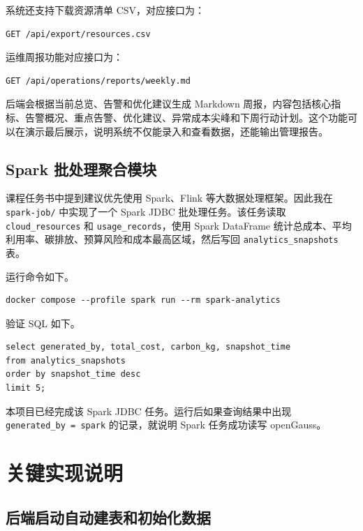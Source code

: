系统还支持下载资源清单 CSV，对应接口为：

\begin{verbatim}
GET /api/export/resources.csv
\end{verbatim}

运维周报功能对应接口为：

\begin{verbatim}
GET /api/operations/reports/weekly.md
\end{verbatim}

后端会根据当前总览、告警和优化建议生成 Markdown
周报，内容包括核心指标、告警概况、重点告警、优化建议、异常成本尖峰和下周行动计划。这个功能可以在演示最后展示，说明系统不仅能录入和查看数据，还能输出管理报告。

\subsection{Spark
批处理聚合模块}\label{spark-ux6279ux5904ux7406ux805aux5408ux6a21ux5757}

课程任务书中提到建议优先使用 Spark、Flink 等大数据处理框架。因此我在
\texttt{spark-job/} 中实现了一个 Spark JDBC 批处理任务。该任务读取
\texttt{cloud\_resources} 和 \texttt{usage\_records}，使用 Spark
DataFrame
统计总成本、平均利用率、碳排放、预算风险和成本最高区域，然后写回
\texttt{analytics\_snapshots} 表。

运行命令如下。

\begin{verbatim}
docker compose --profile spark run --rm spark-analytics
\end{verbatim}

验证 SQL 如下。

\begin{verbatim}
select generated_by, total_cost, carbon_kg, snapshot_time
from analytics_snapshots
order by snapshot_time desc
limit 5;
\end{verbatim}

本项目已经完成该 Spark JDBC 任务。运行后如果查询结果中出现
\texttt{generated\_by\ =\ \textquotesingle{}spark\textquotesingle{}}
的记录，就说明 Spark 任务成功读写 openGauss。

\section{关键实现说明}\label{ux5173ux952eux5b9eux73b0ux8bf4ux660e}

\subsection{后端启动自动建表和初始化数据}\label{ux540eux7aefux542fux52a8ux81eaux52a8ux5efaux8868ux548cux521dux59cbux5316ux6570ux636e}

